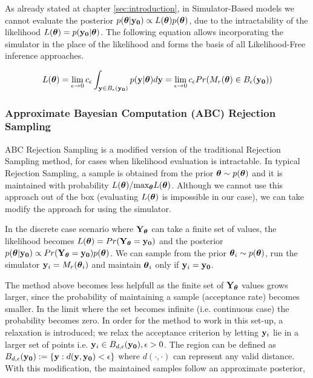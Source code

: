 As already stated at chapter \ref{sec:introduction}, in
Simulator-Based models we cannot evaluate the posterior
$p(\boldsymbol{\theta}|\mathbf{y_0}) \propto L(\boldsymbol{\theta})p(\boldsymbol{\theta})$, due to the
intractability of the likelihood $L(\boldsymbol{\theta}) = p(\mathbf{y_0}|\boldsymbol{\theta})$. The
following equation allows incorporating the simulator in the place of
the likelihood and forms the basis of all Likelihood-Free inference
approaches.

\begin{equation} \label{eq:likelihood} L(\boldsymbol{\theta}) = \lim_{\epsilon \to
    0} c_\epsilon \int_{\mathbf{y} \in B_\epsilon(\mathbf{y_0})} p(\mathbf{y}|\boldsymbol{\theta})d\mathbf{y}
  = \lim_{\epsilon \to 0} c_\epsilon Pr(M_r(\boldsymbol{\theta}) \in
  B_\epsilon(\mathbf{y_0}))
\end{equation}

\subsubsection{Approximate Bayesian Computation (ABC) Rejection
  Sampling}

ABC Rejection Sampling is a modified version of the traditional
Rejection Sampling method, for cases when likelihood evaluation is
intractable. In typical Rejection Sampling, a sample is obtained from
the prior $\boldsymbol{\theta} \sim p(\boldsymbol{\theta})$ and it is maintained with
probability $L(\boldsymbol{\theta})/ \text{max}_{\boldsymbol{\theta}} L(\boldsymbol{\theta})$. Although we
cannot use this approach out of the box (evaluating $L(\boldsymbol{\theta})$ is
impossible in our case), we can take modify the approach for using the
simulator.

In the discrete case scenario where $\mathbf{Y}_{\boldsymbol{\theta}}$ can take a finite
set of values, the likelihood becomes
$L(\boldsymbol{\theta}) = Pr(\mathbf{Y}_{\boldsymbol{\theta}} = \mathbf{y_0})$ and the posterior
$p(\boldsymbol{\theta}|\mathbf{y_0}) \propto Pr(\mathbf{Y}_{\boldsymbol{\theta}}=\mathbf{y_0})p(\boldsymbol{\theta})$. We can
sample from the prior $\boldsymbol{\theta}_i \sim p(\boldsymbol{\theta})$, run the simulator
$\mathbf{y}_i = M_r(\boldsymbol{\theta}_i)$ and maintain $\boldsymbol{\theta}_i$ only if
$\mathbf{y}_i = \mathbf{y_0}$.

The method above becomes less helpfull as the finite set of
$\mathbf{Y}_{\boldsymbol{\theta}}$ values grows larger, since the probability of
maintaining a sample (acceptance rate) becomes smaller. In the limit
where the set becomes infinite (i.e. continuous case) the probability
becomes zero. In order for the method to work in this set-up, a
relaxation is introduced; we relax the acceptance criterion by letting
$\mathbf{y}_{i}$ lie in a larger set of points i.e.
$\mathbf{y}_{i} \in B_{d,\epsilon}(\mathbf{y_0}), \epsilon > 0$. The region can be
defined as $B_{d,\epsilon} (\mathbf{y_0}) := \{\mathbf{y}: d(\mathbf{y}, \mathbf{y_0}) < \epsilon \}$
where $d(\cdot, \cdot)$ can represent any valid distance. With this
modification, the maintained samples follow an approximate posterior,

